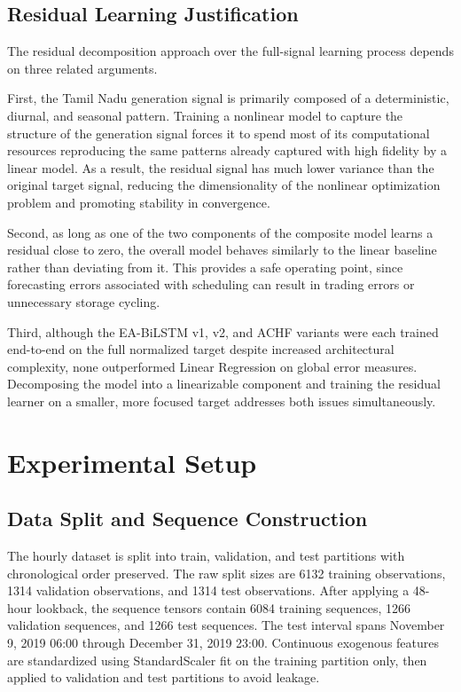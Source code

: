 \documentclass{ieeeaccess}
\begin{document}
\subsection{Residual Learning Justification}
The residual decomposition approach over the full-signal learning process depends on three related arguments.

First, the Tamil Nadu generation signal is primarily composed of a deterministic, diurnal, and seasonal pattern. Training a nonlinear model to capture the structure of the generation signal forces it to spend most of its computational resources reproducing the same patterns already captured with high fidelity by a linear model. As a result, the residual signal has much lower variance than the original target signal, reducing the dimensionality of the nonlinear optimization problem and promoting stability in convergence.

Second, as long as one of the two components of the composite model learns a residual close to zero, the overall model behaves similarly to the linear baseline rather than deviating from it. This provides a safe operating point, since forecasting errors associated with scheduling can result in trading errors or unnecessary storage cycling.

Third, although the EA-BiLSTM v1, v2, and ACHF variants were each trained end-to-end on the full normalized target despite increased architectural complexity, none outperformed Linear Regression on global error measures. Decomposing the model into a linearizable component and training the residual learner on a smaller, more focused target addresses both issues simultaneously.

\section{Experimental Setup}
\subsection{Data Split and Sequence Construction}
The hourly dataset is split into train, validation, and test partitions with chronological order preserved. The raw split sizes are 6132 training observations, 1314 validation observations, and 1314 test observations. After applying a 48-hour lookback, the sequence tensors contain 6084 training sequences, 1266 validation sequences, and 1266 test sequences. The test interval spans November 9, 2019 06:00 through December 31, 2019 23:00. Continuous exogenous features are standardized using StandardScaler fit on the training partition only, then applied to validation and test partitions to avoid leakage.
\end{document}
